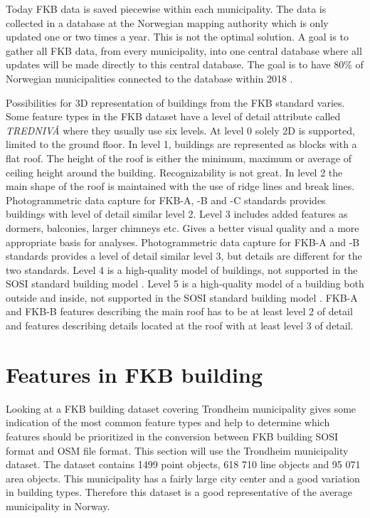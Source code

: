 Today FKB data is saved piecewise within each municipality. The data is collected in a database at the Norwegian mapping authority which is only updated one or two times a year. This is not the optimal solution. A goal is to gather all FKB data, from every municipality, into one central database where all updates will be made directly to this central database. The goal is to have 80\% of Norwegian municipalities connected to the database within 2018 \cite{Kartverket2016a}.  

Possibilities for 3D representation of buildings from the FKB standard varies. Some feature types in the FKB dataset have a level of detail attribute called \textit{TREDNIVÅ} where they usually use six levels. At level 0 solely 2D is supported, limited to the ground floor. In level 1, buildings are represented as blocks with a flat roof. The height of the roof is either the minimum, maximum or average of ceiling height around the building. Recognizability is not great. In level 2 the main shape of the roof is maintained with the use of ridge lines and break lines. Photogrammetric data capture for FKB-A, -B and -C standards provides buildings with level of detail similar level 2. Level 3 includes added features as dormers, balconies, larger chimneys etc. %
Gives a better visual quality and a more appropriate basis for analyses.  Photogrammetric data capture for FKB-A and -B standards provides a level of detail similar level 3, but details are different for the two standards. Level 4 is a high-quality model of buildings, not supported in the SOSI standard building model \cite{Kartverket}. Level 5 is a high-quality model of a building both outside and inside, not supported in the SOSI standard building model \cite{Kartverket}. FKB-A and FKB-B features describing the main roof has to be at least level 2 of detail and features describing details located at the roof with at least level 3 of detail. 

\section{Features in FKB building}\label{sec:FKBbuilding}
Looking at a FKB building dataset covering Trondheim municipality gives some indication of the most common feature types and help to determine which features should be prioritized in the conversion between FKB building SOSI format and OSM file format. This section will use the Trondheim municipality dataset. The dataset contains 1499 point objects, 618 710 line objects and 95 071 area objects. This municipality has a fairly large city center and a good variation in building types. %
Therefore this dataset is a good representative of the average municipality in Norway. 

